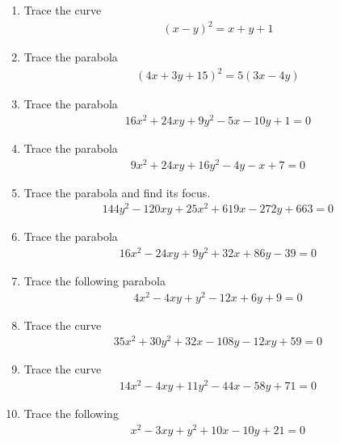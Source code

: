 \renewcommand{\theequation}{\theenumi}
\renewcommand{\thefigure}{\theenumi}
\begin{enumerate}[label=\thesubsection.\arabic*.,ref=\thesubsection.\theenumi]
%
\item 	Trace the curve 
	\begin{align}
	\left(x-y\right)^2 = x+y+1
	\label{eq:solutions/41/2/eq0}
	\end{align}
%
\solution

%
\item Trace the parabola
\begin{align}
    (4x+3y+15)^2=5(3x-4y)
\end{align}
%
\solution

%
\item Trace the parabola
\begin{align}\nonumber
    16x^2+24xy+9y^2-5x-10y+1 = 0
\end{align}
%
\solution

%
\item Trace the parabola
\begin{align}
  9x^2+24xy+16y^2-4y-x+7=0 \label{eq:solutions/41/6/eq:prob}
\end{align}
%
\solution

%
\item Trace the parabola and find its focus.
\begin{align}
144y^2-120xy+25x^2+619x-272y+663=0
\end{align}
%
%
\solution

\item Trace the parabola
\begin{align}
   16x^2-24xy+9y^2+32x+86y-39=0 \label{eq:solutions/41/8/eq:given}
\end{align}
%
\solution

\item Trace the following parabola
\begin{align}
    4x^2-4xy+y^2-12x+6y+9=0
\end{align}
%
%
\solution

\item Trace the curve
\begin{align}
35x^2+30y^2+32x-108y-12xy+59=0 \label{eq:solutions/41/ex/given_curve_eq}
\end{align}
%
\solution

\item Trace the curve
\begin{align}
14x^2 - 4xy + 11y^2 - 44x - 58y + 71 =0  \label{eq:solutions/41/ex1/given_curve_eq}
\end{align}

\solution

\item Trace the following 
\begin{align}
    x^2-3xy+y^2+10x-10y+21=0 \label{eq:solutions/41/ex2/eq 1}
\end{align}
%
\solution


\end{enumerate}

